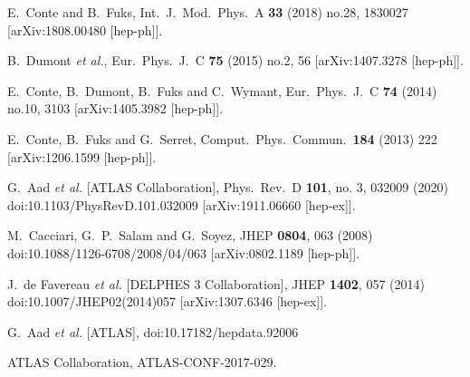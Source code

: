 \documentclass{ws-mpla}
\begin{document}
\begin{thebibliography}{99}
  E.~Conte and B.~Fuks,
  Int.\ J.\ Mod.\ Phys.\ A {\bf 33} (2018) no.28,  1830027
  [arXiv:1808.00480 [hep-ph]].

  B.~Dumont {\it et al.},
  Eur.\ Phys.\ J.\ C {\bf 75} (2015) no.2,  56
  [arXiv:1407.3278 [hep-ph]].

  E.~Conte, B.~Dumont, B.~Fuks and C.~Wymant,
  Eur.\ Phys.\ J.\ C {\bf 74} (2014) no.10,  3103
  [arXiv:1405.3982 [hep-ph]].

  E.~Conte, B.~Fuks and G.~Serret,
  Comput.\ Phys.\ Commun.\  {\bf 184} (2013) 222
  [arXiv:1206.1599 [hep-ph]].

  G.~Aad {\it et al.} [ATLAS Collaboration],
  Phys.\ Rev.\ D {\bf 101}, no. 3, 032009 (2020)
  doi:10.1103/PhysRevD.101.032009
  [arXiv:1911.06660 [hep-ex]].

  M.~Cacciari, G.~P.~Salam and G.~Soyez,
  JHEP {\bf 0804}, 063 (2008)
  doi:10.1088/1126-6708/2008/04/063
  [arXiv:0802.1189 [hep-ph]].

  J.~de Favereau {\it et al.} [DELPHES 3 Collaboration],
  JHEP {\bf 1402}, 057 (2014)
  doi:10.1007/JHEP02(2014)057
  [arXiv:1307.6346 [hep-ex]].

  G.~Aad \textit{et al.} [ATLAS],
  doi:10.17182/hepdata.92006

  ATLAS Collaboration,
  ATLAS-CONF-2017-029.


\end{thebibliography}
\end{document}
